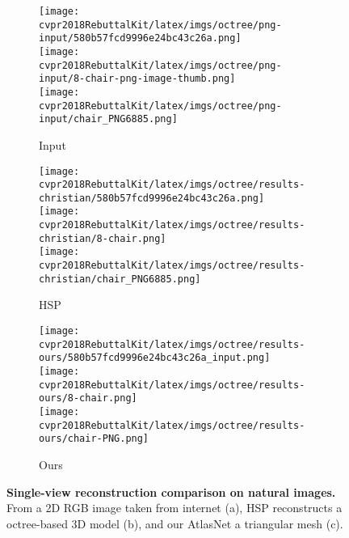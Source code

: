\documentclass[10pt,twocolumn,letterpaper]{article}
\newcommand{\ournet}{AtlasNet}
\begin{document}
\begin{figure}[t!]
\centering
\begin{subfigure}[b]{0.30\linewidth}
\begin{minipage}[c]{0.99\linewidth}
\centering
 \texttt{[image: cvpr2018RebuttalKit/latex/imgs/octree/png-input/580b57fcd9996e24bc43c26a.png]}\\
 \texttt{[image: cvpr2018RebuttalKit/latex/imgs/octree/png-input/8-chair-png-image-thumb.png]}\\
  \texttt{[image: cvpr2018RebuttalKit/latex/imgs/octree/png-input/chair\_PNG6885.png]}\\
\caption{Input}
\end{minipage}
\end{subfigure}
\begin{subfigure}[b]{0.30\linewidth}
\begin{minipage}[c]{0.99\linewidth}

\centering
 \texttt{[image: cvpr2018RebuttalKit/latex/imgs/octree/results-christian/580b57fcd9996e24bc43c26a.png]}\\
 \texttt{[image: cvpr2018RebuttalKit/latex/imgs/octree/results-christian/8-chair.png]}\\
  \texttt{[image: cvpr2018RebuttalKit/latex/imgs/octree/results-christian/chair\_PNG6885.png]}
\caption{HSP}
\end{minipage}

\end{subfigure}
\begin{subfigure}[b]{0.30\linewidth}
\begin{minipage}[c]{0.99\linewidth}

\centering
 \texttt{[image: cvpr2018RebuttalKit/latex/imgs/octree/results-ours/580b57fcd9996e24bc43c26a\_input.png]}\\
 \texttt{[image: cvpr2018RebuttalKit/latex/imgs/octree/results-ours/8-chair.png]}\\
 \texttt{[image: cvpr2018RebuttalKit/latex/imgs/octree/results-ours/chair-PNG.png]}\\

\caption{Ours}
\end{minipage}

\end{subfigure}
\setlength{\belowcaptionskip}{-5pt}
\medskip
\caption{
{\bf Single-view reconstruction comparison on natural images.}
From a 2D RGB image taken from internet (a),  HSP \cite{Hane:2017} reconstructs a octree-based 3D model (b), and our \ournet{} a triangular mesh (c).}
  \label{fig:svr_real_images} \vspace{-4mm}
\end{figure}
\end{document}
